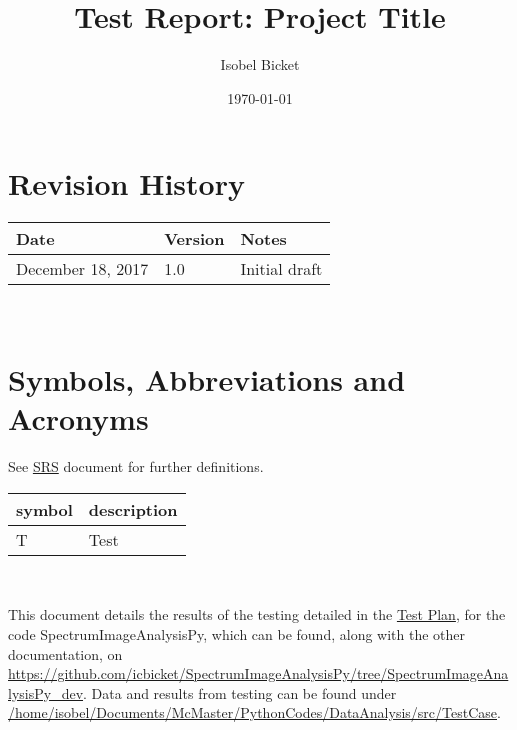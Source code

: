 \documentclass[12pt, titlepage]{article}
\newcommand{\progname}{SpectrumImageAnalysisPy}
\begin{document}
\title{Test Report: Project Title} 
\author{Isobel Bicket}
\date{\today}
	
\maketitle


\section{Revision History}

\begin{tabularx}{\textwidth}{p{4cm}p{2cm}X}
\toprule {\bf Date} & {\bf Version} & {\bf Notes}\\
\midrule
December 18, 2017 & 1.0 & Initial draft\\
\bottomrule
\end{tabularx}

~\newpage

\section{Symbols, Abbreviations and Acronyms}
See \hyperref[Doc:SRS]{SRS} document for further definitions.\\

\renewcommand{\arraystretch}{1.2}
\begin{tabular}{l l} 
  \toprule		
  \textbf{symbol} & \textbf{description}\\
  \midrule 
  T & Test\\
  \bottomrule
\end{tabular}\\


\newpage

\tableofcontents

\listoftables %

\listoffigures %

\newpage


This document details the results of the testing detailed in the
\hyperref[Doc:TestPlan]{Test Plan}, for the code \progname, which can be found,
along with the other documentation, on
\url{https://github.com/icbicket/SpectrumImageAnalysisPy/tree/SpectrumImageAnalysisPy_dev}. 
Data and results from testing can be found under 
\url{/home/isobel/Documents/McMaster/PythonCodes/DataAnalysis/src/TestCase}.
\end{document}
